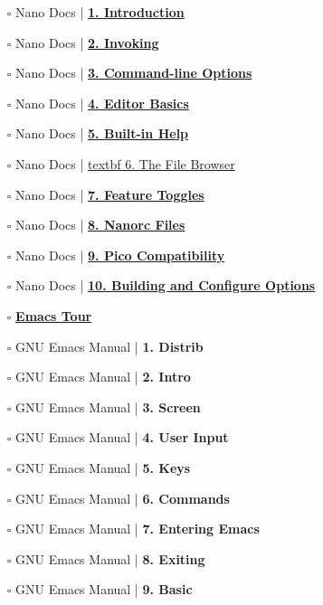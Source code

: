 \documentclass[a4, landscape, 12pt]{article}
\newcommand{\checkbox}{$\square$}%
\begin{document}
\begin{itemize}
\item [\checkbox]  Nano Docs | \href{https://www.nano-editor.org/dist/latest/nano.html}{\textbf{ 1. Introduction}
}
\item [\checkbox]  Nano Docs | \href{https://www.nano-editor.org/dist/latest/nano.html}{\textbf{ 2. Invoking
}}
\item [\checkbox]  Nano Docs | \href{https://www.nano-editor.org/dist/latest/nano.html}{\textbf{ 3. Command-line Options
}}
\item [\checkbox]  Nano Docs | \href{https://www.nano-editor.org/dist/latest/nano.html}{\textbf{ 4. Editor Basics
}}
\item [\checkbox]  Nano Docs | \href{https://www.nano-editor.org/dist/latest/nano.html}{\textbf{ 5. Built-in Help
}}
\item [\checkbox]  Nano Docs | \href{https://www.nano-editor.org/dist/latest/nano.html}{textbf{ 6. The File Browser
}}
\item [\checkbox]  Nano Docs | \href{https://www.nano-editor.org/dist/latest/nano.html}{\textbf{ 7. Feature Toggles
}}
\item [\checkbox]  Nano Docs | \href{https://www.nano-editor.org/dist/latest/nano.html}{\textbf{ 8. Nanorc Files
}}
\item [\checkbox]  Nano Docs | \href{https://www.nano-editor.org/dist/latest/nano.html}{\textbf{ 9. Pico Compatibility
}}
\item [\checkbox]  Nano Docs | \href{https://www.nano-editor.org/dist/latest/nano.html}{\textbf{ 10. Building and Configure Options
}}
\item [\checkbox]  \href{https://www.gnu.org/software/emacs/tour/}{\textbf{Emacs Tour}
}
\item [\checkbox]  GNU Emacs Manual | \textbf{ 1. Distrib
}
\item [\checkbox]  GNU Emacs Manual | \textbf{ 2. Intro
}
\item [\checkbox]  GNU Emacs Manual | \textbf{ 3. Screen
}
\item [\checkbox]  GNU Emacs Manual | \textbf{ 4. User Input
}
\item [\checkbox]  GNU Emacs Manual | \textbf{ 5. Keys
}
\item [\checkbox]  GNU Emacs Manual | \textbf{ 6. Commands
}
\item [\checkbox]  GNU Emacs Manual | \textbf{ 7. Entering Emacs
}
\item [\checkbox]  GNU Emacs Manual | \textbf{ 8. Exiting
}
\item [\checkbox]  GNU Emacs Manual | \textbf{ 9. Basic
}
\end{itemize}
\end{document}
